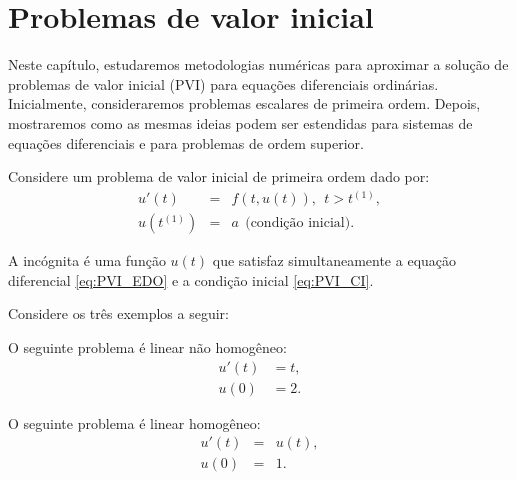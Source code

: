 
%

\chapter{Problemas de valor inicial}
Neste capítulo, estudaremos metodologias numéricas para aproximar a solução de problemas de valor inicial (PVI) para equações diferenciais ordinárias. Inicialmente, consideraremos problemas escalares de primeira ordem. Depois, mostraremos como as mesmas ideias podem ser estendidas para sistemas de equações diferenciais e para problemas de ordem superior.

Considere um problema de valor inicial de primeira ordem dado por:
\begin{subequations}\label{eq:PVI}
\begin{eqnarray}
  u'(t) &=& f(t,u(t)),~~t>t^{(1)},\label{eq:PVI_EDO}\\
  u(t^{(1)}) &=& a ~~ \text{(condição inicial)}.\label{eq:PVI_CI}
\end{eqnarray}
\end{subequations}

A incógnita é uma função $u(t)$ que satisfaz simultaneamente a equação diferencial \eqref{eq:PVI_EDO} e a condição inicial \eqref{eq:PVI_CI}.

Considere os três exemplos a seguir:
\begin{ex} O seguinte problema é linear não homogêneo:
\begin{equation}
\begin{split}
    u'(t) &=t,\\
    u(0) &= 2.
\end{split}
\end{equation}
\end{ex}

\begin{ex} O seguinte problema é linear homogêneo:
\begin{eqnarray}
   u'(t) &=&u(t),\\
   u(0) &=& 1.
\end{eqnarray}
\end{ex}

